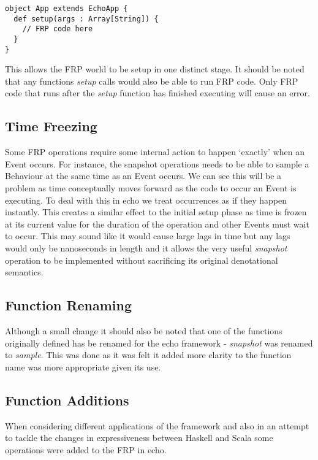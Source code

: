 \begin{verbatim}
object App extends EchoApp {
  def setup(args : Array[String]) {
    // FRP code here
  }
}
\end{verbatim}

      This allows the FRP world to be setup in one distinct stage. It should be noted that
      any functions \emph{setup} calls would also be able to run FRP code. Only FRP code that runs
      after the \emph{setup} function has finished executing will cause an error.
      
    \subsection{Time Freezing}
      Some FRP operations require some internal action to happen `exactly' when an Event occurs. For instance,
      the snapshot operations needs to be able to sample a Behaviour at the same time as an Event occurs.
      We can see this will be a problem as time conceptually moves forward as the code to
      occur an Event is executing. To deal with this in echo we treat occurrences as if they happen instantly. This
      creates a similar effect to the initial setup phase as time is frozen at its current value for the duration
      of the operation and other Events must wait to occur. This may sound like it would cause large lags in time
      but any lags would only be nanoseconds in length and it allows the very useful \emph{snapshot} operation
      to be implemented without sacrificing its original denotational semantics.
    
    \subsection{Function Renaming}
      Although a small change it should also be noted that one of the functions originally defined
      has be renamed for the echo framework - \emph{snapshot} was renamed to \emph{sample}. This was done as
      it was felt it added more clarity to the function name was more appropriate given its use.
      
    \subsection{Function Additions}
      When considering different applications of the framework and also in an attempt to
      tackle the changes in expressiveness between Haskell and Scala some operations
      were added to the FRP in echo.
      
